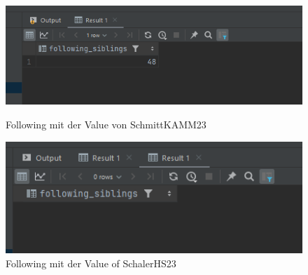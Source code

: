 \documentclass[11pt]{scrartcl}
\begin{document}
\begin{figure}[H]
    \begin{minipage}[b]{.4\linewidth}
        \begin{center}
            \includegraphics[width=\linewidth]{img.png}
            \caption{Following mit der Value von SchmittKAMM23}
        \end{center}
    \end{minipage}
    \hspace{.1\linewidth}
    \begin{minipage}[b]{.4\linewidth}
        \begin{center}
            \includegraphics[width=\linewidth]{img_5.png}
            \caption{Following mit der Value of SchalerHS23}
        \end{center}
    \end{minipage}
\end{figure}
\end{document}
